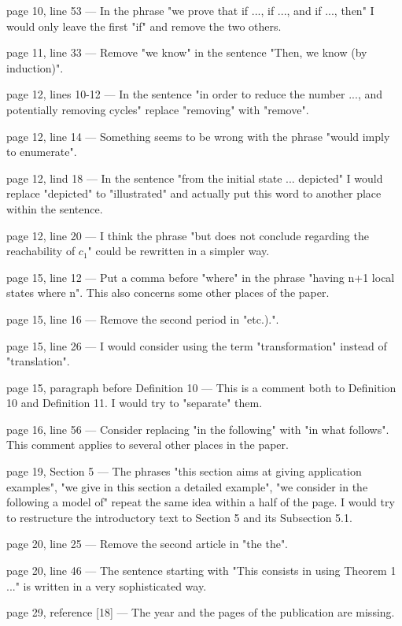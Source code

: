 \documentclass[11pt]{article}
\begin{document}
page 10, line 53 ---
In the phrase "we prove that if ..., if ..., and if ..., then" I would only leave the first "if" and remove the two others.

page 11, line 33 ---
Remove "we know" in the sentence "Then, we know (by induction)".

page 12, lines 10-12 ---
In the sentence "in order to reduce the number ..., and potentially removing cycles" replace "removing" with "remove".

page 12, line 14 ---
Something seems to be wrong with the phrase "would imply to enumerate".

page 12, lind 18 ---
In the sentence "from the initial state ... depicted" I would replace "depicted" to "illustrated" and actually put this word to another place within the sentence.

page 12, line 20 ---
I think the phrase "but does not conclude regarding the reachability of $c_1$" could be rewritten in a simpler way.

page 15, line 12 ---
Put a comma before "where" in the phrase "having n+1 local states where n".
This also concerns some other places of the paper.

page 15, line 16 ---
Remove the second period in "etc.).".

page 15, line 26 ---
I would consider using the term "transformation" instead of "translation".

page 15, paragraph before Definition 10 ---
This is a comment both to Definition 10 and Definition 11. I would try to "separate" them.

page 16, line 56 ---
Consider replacing "in the following" with "in what follows".
This comment applies to several other places in the paper.

page 19, Section 5 ---
The phrases "this section aims at giving application examples", "we give in this section a detailed example", "we consider in the following a model of" repeat the same idea within a half of the page. I would try to restructure the introductory text to Section 5 and its Subsection 5.1.

page 20, line 25 ---
Remove the second article in "the the".

page 20, line 46 ---
The sentence starting with "This consists in using Theorem 1 ..." is written in a very sophisticated way.

page 29, reference [18] ---
The year and the pages of the publication are missing.


\end{document}
